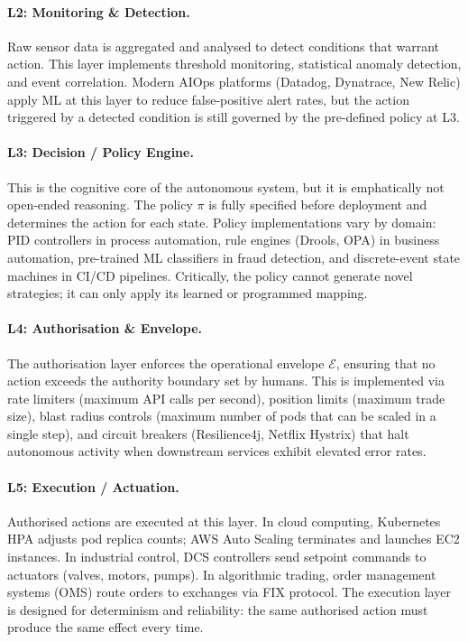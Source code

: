 \documentclass[12pt, a4paper]{article}
\begin{document}
\paragraph{L2: Monitoring \& Detection.}
Raw sensor data is aggregated and analysed to detect conditions that warrant action. This layer implements threshold monitoring, statistical anomaly detection, and event correlation. Modern AIOps platforms (Datadog, Dynatrace, New Relic) apply ML at this layer to reduce false-positive alert rates, but the action triggered by a detected condition is still governed by the pre-defined policy at L3.

\paragraph{L3: Decision / Policy Engine.}
This is the cognitive core of the autonomous system, but it is emphatically not open-ended reasoning. The policy $\pi$ is fully specified before deployment and determines the action for each state. Policy implementations vary by domain: PID controllers in process automation, rule engines (Drools, OPA) in business automation, pre-trained ML classifiers in fraud detection, and discrete-event state machines in CI/CD pipelines. Critically, the policy cannot generate novel strategies; it can only apply its learned or programmed mapping.

\paragraph{L4: Authorisation \& Envelope.}
The authorisation layer enforces the operational envelope $\mathcal{E}$, ensuring that no action exceeds the authority boundary set by humans. This is implemented via rate limiters (maximum API calls per second), position limits (maximum trade size), blast radius controls (maximum number of pods that can be scaled in a single step), and circuit breakers (Resilience4j, Netflix Hystrix) that halt autonomous activity when downstream services exhibit elevated error rates.

\paragraph{L5: Execution / Actuation.}
Authorised actions are executed at this layer. In cloud computing, Kubernetes HPA adjusts pod replica counts; AWS Auto Scaling terminates and launches EC2 instances. In industrial control, DCS controllers send setpoint commands to actuators (valves, motors, pumps). In algorithmic trading, order management systems (OMS) route orders to exchanges via FIX protocol. The execution layer is designed for determinism and reliability: the same authorised action must produce the same effect every time.
\end{document}
